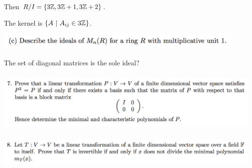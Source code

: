 Then $R/I = \{3\mathbb{Z}, 3\mathbb{Z} + 1, 3\mathbb{Z} + 2\}$.

The kernel is $\{A ~|~ A_{ij} \in 3\mathbb{Z}\}$.

\begin{mdframed}
  \includegraphics[width=350pt]{img/linear-algebra-a0-1-6-c.png}\\
\end{mdframed}
The set of diagonal matrices is the sole ideal?

\newpage
\subsubsection{} %
\begin{mdframed}
  \includegraphics[width=400pt]{img/linear-algebra-a0-1-7.png}\\
\end{mdframed}

\subsubsection{} %
\begin{mdframed}
  \includegraphics[width=400pt]{img/linear-algebra-a0-1-8.png}\\
\end{mdframed}

